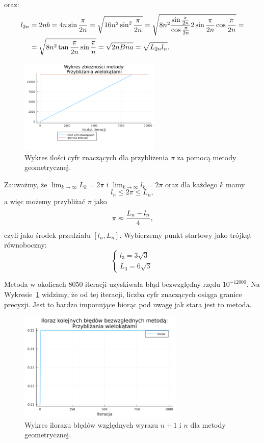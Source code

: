oraz:
\begin{align*}
    l_{2n}&=2nb=4n\sin{\pi\over 2n}=\sqrt{16n^2\sin^2{\pi\over 2n}}=\sqrt{8n^2{\sin{\pi\over2n}\over\cos{\pi\over 2n}}2\sin{\pi\over 2n}\cos{\pi\over 2n}}=\\
    &=\sqrt{8n^2\tan{\pi\over 2n}\sin{\pi\over n}}=\sqrt{2nBna}=\sqrt{L_{2n}l_n}.
\end{align*}
\begin{figure}[!h]\centering
    \renewcommand{\figurename}{Wykres}
    \includegraphics[width=0.6\textwidth]{../prog/geo3_log_error.png}
    \caption{Wykres ilości cyfr znaczących dla przybliżenia $\pi$ za pomocą metody geometrycznej.}
    \label{geometric-error}
\end{figure}

Zauważmy, że $\lim_{k\to\infty}L_k=2\pi$ i $\lim_{k\to\infty}l_k=2\pi$ oraz dla każdego $k$ mamy
$$l_n\leq 2\pi\leq L_n,$$
a więc możemy przybliżać $\pi$ jako
$$\pi\approx{L_n-l_n\over 4},$$
czyli jako środek przedziału $[l_n,L_n]$. Wybierzemy punkt startowy jako trójkąt równoboczny:
$$\begin{cases}
    l_3=3\sqrt3\\
    L_3=6\sqrt3
\end{cases}$$

Metoda w okolicach 8050 iteracji uzyskiwała błąd bezwzględny rzędu $10^{-12000}$. Na Wykresie~\ref{geometric-error} widzimy, że od tej iteracji, liczba cyfr znaczących osiąga granice precyzji. Jest to bardzo imponujące biorąc pod uwagę jak stara jest to metoda.

\begin{figure}[!h]\centering
    \renewcommand{\figurename}{Wykres}
    \includegraphics[width=0.7\textwidth]{../prog/geo3_error_ratio.png}
    \caption{Wykres ilorazu błędów względnych wyrazu $n+1$ i $n$ dla metody geometrycznej.}
    \label{geometric-convergence}
\end{figure}

